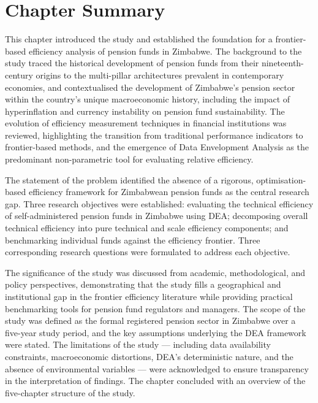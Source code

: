 \documentclass[12pt,a4paper]{article}
\begin{document}
\section{Chapter Summary}

This chapter introduced the study and established the foundation for a frontier-based efficiency analysis of pension funds in Zimbabwe. The background to the study traced the historical development of pension funds from their nineteenth-century origins to the multi-pillar architectures prevalent in contemporary economies, and contextualised the development of Zimbabwe's pension sector within the country's unique macroeconomic history, including the impact of hyperinflation and currency instability on pension fund sustainability. The evolution of efficiency measurement techniques in financial institutions was reviewed, highlighting the transition from traditional performance indicators to frontier-based methods, and the emergence of Data Envelopment Analysis as the predominant non-parametric tool for evaluating relative efficiency.

The statement of the problem identified the absence of a rigorous, optimisation-based efficiency framework for Zimbabwean pension funds as the central research gap. Three research objectives were established: evaluating the technical efficiency of self-administered pension funds in Zimbabwe using DEA; decomposing overall technical efficiency into pure technical and scale efficiency components; and benchmarking individual funds against the efficiency frontier. Three corresponding research questions were formulated to address each objective.

The significance of the study was discussed from academic, methodological, and policy perspectives, demonstrating that the study fills a geographical and institutional gap in the frontier efficiency literature while providing practical benchmarking tools for pension fund regulators and managers. The scope of the study was defined as the formal registered pension sector in Zimbabwe over a five-year study period, and the key assumptions underlying the DEA framework were stated. The limitations of the study --- including data availability constraints, macroeconomic distortions, DEA's deterministic nature, and the absence of environmental variables --- were acknowledged to ensure transparency in the interpretation of findings. The chapter concluded with an overview of the five-chapter structure of the study.
\end{document}
